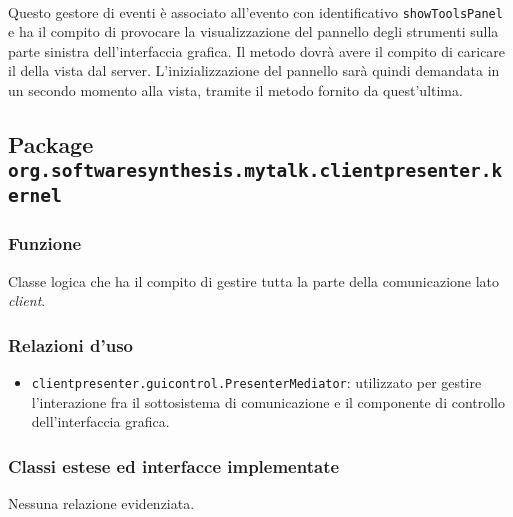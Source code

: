 \begin{description}
  \item{}\\
  Questo gestore di eventi è associato all'evento con identificativo \texttt{showToolsPanel} e ha il compito di provocare la visualizzazione del pannello degli strumenti sulla parte sinistra dell'interfaccia grafica. Il metodo dovrà avere il compito di caricare il  della vista dal server. L'inizializzazione del pannello sarà quindi demandata in un secondo momento alla vista, tramite il metodo  fornito da quest'ultima.

\end{description}


\subsection{Package \texttt{org.softwaresynthesis.mytalk.clientpresenter.kernel}}\label{sec:kernel}

\subsubsection*{Funzione}
Classe logica che ha il compito di gestire tutta la parte della comunicazione lato \textit{client}.

\subsubsection*{Relazioni d'uso}
\begin{itemize}
  \item \texttt{clientpresenter.guicontrol.PresenterMediator}: utilizzato per gestire l'interazione fra il sottosistema di comunicazione e il componente di controllo dell'interfaccia grafica.
\end{itemize}

\subsubsection*{Classi estese ed interfacce implementate}
Nessuna relazione evidenziata.

